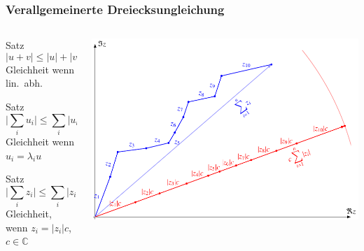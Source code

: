 %
%
%
\bgroup
\begin{frame}[t]
\setlength{\abovedisplayskip}{5pt}
\setlength{\belowdisplayskip}{5pt}
\frametitle{Verallgemeinerte Dreiecksungleichung}
\vspace{-20pt}
\begin{columns}[t,onlytextwidth]
\begin{column}{0.32\textwidth}
\begin{block}{Satz}
\[
|u+v|\le |u|+|v|
\]
Gleichheit wenn lin.~abh.
\end{block}
\begin{block}{Satz}
\[
\biggl|\sum_i u_i\biggr|
\le
\sum_i |u_i|
\]
Gleichheit wenn $u_i = \lambda_i u$
\end{block}
\begin{block}{Satz}
\[
\biggl|\sum_i z_i\biggr|
\le
\sum_i |z_i|
\]
Gleichheit, wenn $z_i=|z_i|c$, $c\in\mathbb{C}$
\end{block}
\end{column}
\begin{column}{0.68\textwidth}
\begin{center}
\includegraphics[width=\textwidth]{../../buch/chapters/80-wahrscheinlichkeit/images/dreieck.pdf}
\end{center}
\end{column}
\end{columns}
\end{frame}
\egroup
